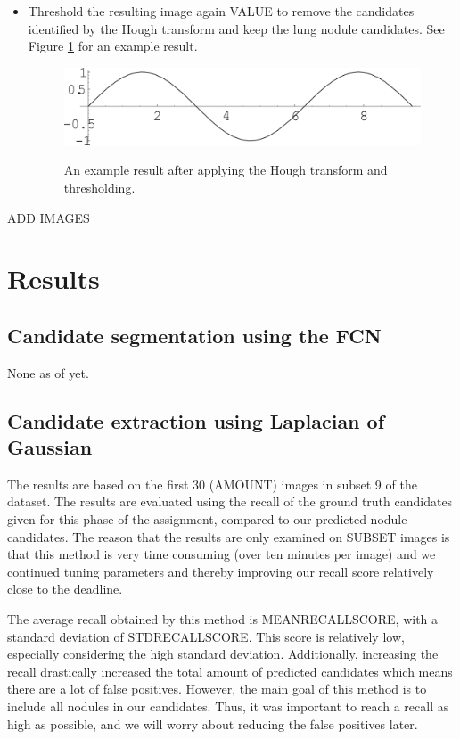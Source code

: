 \documentclass{article}
\begin{document}
\begin{itemize}
\item Threshold the resulting image again VALUE to remove the candidates identified by the Hough transform and keep the lung nodule candidates. See Figure \ref{figure:Houghresult} for an example result.
	\begin{figure}[h]
	\centering
	{\includegraphics[width=0.7\linewidth]{./figure.png}}
	\caption{An example result after applying the Hough transform and thresholding. \label{figure:Houghresult}}
	\end{figure}
\end{itemize}
ADD IMAGES


\section{Results}\label{sec:results}
\subsection{Candidate segmentation using the FCN}
None as of yet.

\subsection{Candidate extraction using Laplacian of Gaussian}
The results are based on the first 30 (AMOUNT) images in subset 9 of the dataset. The results are evaluated using the recall of the ground truth candidates given for this phase of the assignment, compared to our predicted nodule candidates. The reason that the results are only examined on SUBSET images is that this method is very time consuming (over ten minutes per image) and we continued tuning parameters and thereby improving our recall score relatively close to the deadline.

The average recall obtained by this method is MEANRECALLSCORE, with a standard deviation of STDRECALLSCORE. This score is relatively low, especially considering the high standard deviation. Additionally, increasing the recall drastically increased the total amount of predicted candidates which means there are a lot of false positives. However, the main goal of this method is to include all nodules in our candidates. Thus, it was important to reach a recall as high as possible, and we will worry about reducing the false positives later.
\end{document}
